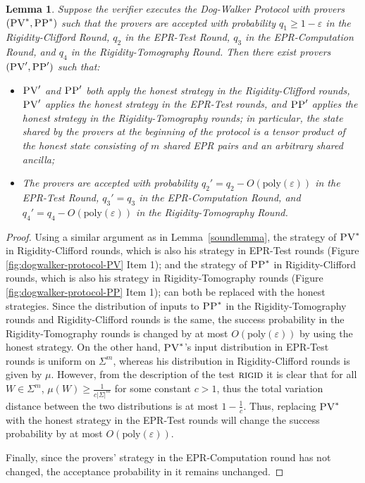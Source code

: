 \documentclass[11pt]{article}
\newtheorem{lemma}[theorem]{Lemma}
\theoremstyle{remark}
\theoremstyle{definition}
\newcommand{\eps}{\varepsilon}
\newcommand{\rigid}{\textsc{rigid}}
\newcommand{\pv}{\textsc{PV}}
\newcommand{\pp}{\textsc{PP}}
\begin{document}
\begin{lemma}\label{lem:PV-2-PP-4}
Suppose the verifier executes the Dog-Walker Protocol 
with provers $(\pv^*,\pp^*)$ such that the provers are accepted with probability $q_1\geq 1-\eps$ in the Rigidity-Clifford Round, $q_2$ in the EPR-Test Round, $q_3$ in the EPR-Computation Round, and $q_4$ in the Rigidity-Tomography Round. Then there exist provers $(\pv',\pp')$ such that:
\begin{itemize}[nolistsep]
\item $\pv'$ and $\pp'$ both apply the honest strategy in the Rigidity-Clifford rounds, $\pv'$ applies the honest strategy in the EPR-Test rounds, and $\pp'$ applies the honest strategy in the Rigidity-Tomography rounds; in particular, the state shared by the provers at the beginning of the protocol is a tensor product of the honest state consisting of $m$ shared EPR pairs and an arbitrary shared ancilla;
\item The provers are accepted with probability $q_2'=q_2-O(\mathrm{poly}(\eps))$ in the EPR-Test Round, $q_3'=q_3$ in the EPR-Computation Round, and $q_4'=q_4-O(\mathrm{poly}(\eps))$ in the Rigidity-Tomography Round. 
\end{itemize}
\end{lemma}

\begin{proof}
Using a similar argument as in Lemma~\ref{soundlemma}, the strategy of $\pv^*$ in
Rigidity-Clifford rounds, which is also his strategy in EPR-Test rounds (Figure \ref{fig:dogwalker-protocol-PV} Item 1); and the strategy of $\pp^*$ in Rigidity-Clifford rounds, which is also his strategy in Rigidity-Tomography rounds (Figure \ref{fig:dogwalker-protocol-PP} Item 1);
 can both be replaced with the honest strategies. Since the distribution of inputs to $\pp^*$ in the Rigidity-Tomography rounds and Rigidity-Clifford rounds is the same, the success probability in the Rigidity-Tomography rounds is changed by at most $O(\mathrm{poly}(\eps))$ by using the honest strategy. 
On the other hand, $\pv^*$'s input distribution in EPR-Test rounds is uniform on $\Sigma^m$, whereas his distribution in Rigidity-Clifford rounds is given by $\mu$. However, from the description of the test $\rigid$ it is clear that for all $W\in\Sigma^m$, $\mu(W)\geq \frac{1}{c|\Sigma|^m}$ for some constant $c>1$, thus the total variation distance between the two distributions is at most $1-\frac{1}{c}$. Thus, replacing $\pv^*$ with the honest strategy in the EPR-Test  rounds will change the success probability by at most  $O(\mathrm{poly}(\eps))$. 

Finally, since the provers' strategy in the EPR-Computation round has not changed, the
  acceptance probability in it remains unchanged.
\end{proof}
\end{document}
